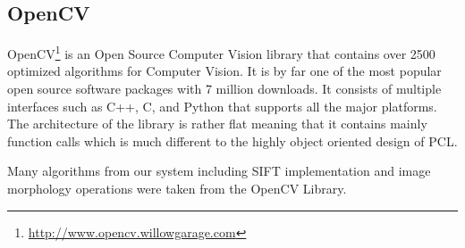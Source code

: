 \subsection{OpenCV}
OpenCV\footnote{\url{http://www.opencv.willowgarage.com}} is an Open Source Computer Vision library that contains over 2500 optimized algorithms for Computer Vision. It is by far one of the most popular open source software packages with 7 million downloads. It consists of multiple interfaces such as C++, C, and Python that supports all the major platforms. The architecture of the library is rather flat meaning that it contains mainly function calls which is much different to the highly object oriented design of PCL.

Many algorithms from our system including SIFT implementation and image morphology operations were taken from the OpenCV Library. 








